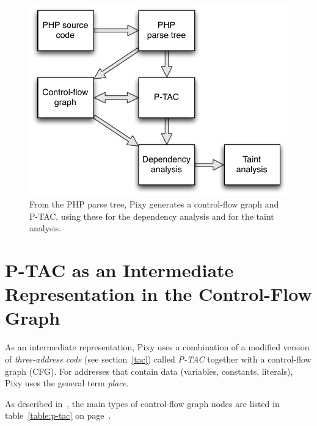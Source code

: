 \begin{figure}[htb]
 \begin{center}
   \includegraphics[scale=0.75]{images/Pixy-Arbeitsweise}
   \caption{From the PHP parse tree, Pixy generates a control-flow graph and P-TAC, using these for the dependency analysis and for the taint analysis.}
   \label{fig:pixy-data-structures}
 \end{center}
\end{figure}

\section{P-TAC as an Intermediate Representation in the Control-Flow Graph}
\label{p-tac}

As an intermediate representation, Pixy uses a combination of a modified version of \emph{three-address code} (see section~\ref{tac}) called \emph{P-TAC} together with a control-flow graph (CFG). For addresses that contain data (variables, constants, literals), Pixy uses the general term \emph{place}.

As described in~\cite{pixy-dissertation}, the main types of control-flow graph nodes are listed in table~\ref{table:p-tac} on page~\pageref{table:p-tac}.

